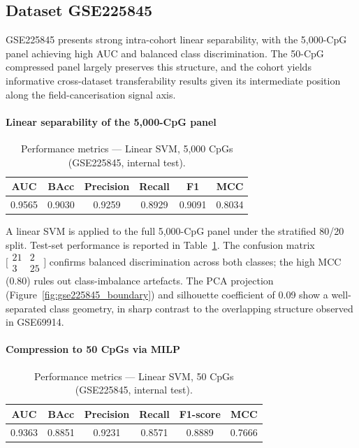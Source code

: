 \subsection{Dataset GSE225845}
\label{sec:results_gse225845}

GSE225845 presents strong intra-cohort linear separability, with the
5,000-CpG panel achieving high AUC and balanced class discrimination.
The 50-CpG compressed panel largely preserves this structure, and the
cohort yields informative cross-dataset transferability results given
its intermediate position along the field-cancerisation signal axis.

\paragraph{Linear separability of the 5,000-CpG panel}

\begin{table}[t]
\centering
\scriptsize
\caption{Performance metrics --- Linear SVM, 5{,}000 CpGs (GSE225845, internal test).}
\label{tab:gse225845_5k}
\begin{tabular}{c c c c c c}
\toprule
AUC & BAcc & Precision & Recall & F1 & MCC \\
\midrule
0.9565 & 0.9030 & 0.9259 & 0.8929 & 0.9091 & 0.8034 \\
\bottomrule
\end{tabular}
\end{table}

A linear SVM is applied to the full 5,000-CpG panel under the stratified
80/20 split.
Test-set performance is reported in Table~\ref{tab:gse225845_5k}.
The confusion matrix
$\bigl[\begin{smallmatrix}21&2\\3&25\end{smallmatrix}\bigr]$
confirms balanced discrimination across both classes; the high MCC (0.80)
rules out class-imbalance artefacts. The PCA projection
(Figure~\ref{fig:gse225845_boundary}) and silhouette coefficient of 0.09
show a well-separated class geometry, in sharp contrast to the overlapping
structure observed in GSE69914.


\paragraph{Compression to 50 CpGs via MILP}

\begin{table}[t]
\centering
\scriptsize
\caption{Performance metrics --- Linear SVM, 50 CpGs (GSE225845, internal test).}
\label{tab:gse225845_50}
\begin{tabular}{c c c c c c}
\toprule
AUC & BAcc & Precision & Recall & F1-score & MCC \\
\midrule
0.9363 & 0.8851 & 0.9231 & 0.8571 & 0.8889 & 0.7666 \\
\bottomrule
\end{tabular}
\end{table}

